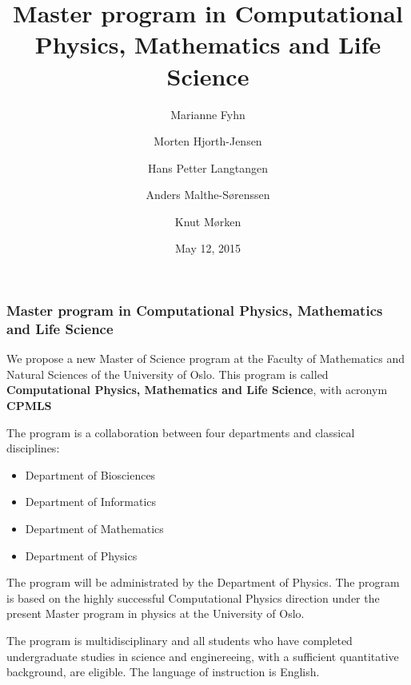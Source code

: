 \documentclass{beamer}
\begin{document}







\title{Master program in Computational Physics, Mathematics and Life Science}


\author{Marianne Fyhn
\and
Morten Hjorth-Jensen
\and
Hans Petter Langtangen
\and
Anders Malthe-Sørenssen
\and
Knut Mørken}

\date{May 12, 2015
}

\begin{frame}
\titlepage
\end{frame}

\begin{frame}
\frametitle{Master program in Computational Physics, Mathematics and Life Science}

\begin{block}{}
We propose a new Master of Science program at the Faculty of Mathematics and Natural Sciences of the University of Oslo. This program is called  \textbf{Computational Physics, Mathematics and Life Science}, with acronym  \textbf{CPMLS} 

The program is a collaboration between four departments and classical disciplines:

\begin{itemize}
 \item Department of Biosciences

 \item Department of Informatics

 \item Department of Mathematics

 \item Department of Physics
\end{itemize}

\noindent
The program will be administrated by the Department of Physics. 
The program is based on the highly successful Computational Physics direction under the present Master program
in physics at the University of Oslo.

The program is multidisciplinary and all students who have completed undergraduate studies in science and enginereeing, with a sufficient quantitative background, are eligible.  The language of instruction is English.
\end{block}
\end{frame}
\end{document}

